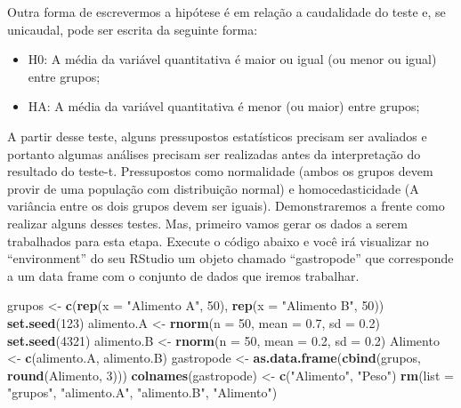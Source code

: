 \documentclass[14pt,titlepage, oneside, openany, a4paper]{book}
\newenvironment{Shaded}{\begin{snugshade}}{\end{snugshade}}
\newcommand{\DataTypeTok}[1]{\textcolor[rgb]{0.13,0.29,0.53}{#1}}
\newcommand{\DecValTok}[1]{\textcolor[rgb]{0.00,0.00,0.81}{#1}}
\newcommand{\FloatTok}[1]{\textcolor[rgb]{0.00,0.00,0.81}{#1}}
\newcommand{\KeywordTok}[1]{\textcolor[rgb]{0.13,0.29,0.53}{\textbf{#1}}}
\newcommand{\NormalTok}[1]{#1}
\newcommand{\StringTok}[1]{\textcolor[rgb]{0.31,0.60,0.02}{#1}}
\begin{document}
Outra forma de escrevermos a hipótese é em relação a caudalidade do teste e, se unicaudal, pode ser escrita da seguinte forma:

\begin{itemize}
\item
  H0: A média da variável quantitativa é maior ou igual (ou menor ou igual) entre grupos;
\item
  HA: A média da variável quantitativa é menor (ou maior) entre grupos;
\end{itemize}

A partir desse teste, alguns pressupostos estatísticos precisam ser avaliados e portanto algumas análises precisam ser realizadas antes da interpretação do resultado do teste-t. Pressupostos como normalidade (ambos os grupos devem provir de uma população com distribuição normal) e homocedasticidade (A variância entre os dois grupos devem ser iguais). Demonstraremos a frente como realizar alguns desses testes. Mas, primeiro vamos gerar os dados a serem trabalhados para esta etapa. Execute o código abaixo e você irá visualizar no ``environment'' do seu RStudio um objeto chamado ``gastropode'' que corresponde a um data frame com o conjunto de dados que iremos trabalhar.

\begin{Shaded}
\begin{Highlighting}[]
\NormalTok{grupos <-}\StringTok{ }\KeywordTok{c}\NormalTok{(}\KeywordTok{rep}\NormalTok{(}\DataTypeTok{x =} \StringTok{"Alimento A"}\NormalTok{, }\DecValTok{50}\NormalTok{), }\KeywordTok{rep}\NormalTok{(}\DataTypeTok{x =} \StringTok{"Alimento B"}\NormalTok{, }\DecValTok{50}\NormalTok{))}
\KeywordTok{set.seed}\NormalTok{(}\DecValTok{123}\NormalTok{)}
\NormalTok{alimento.A <-}\StringTok{ }\KeywordTok{rnorm}\NormalTok{(}\DataTypeTok{n =} \DecValTok{50}\NormalTok{, }\DataTypeTok{mean =} \FloatTok{0.7}\NormalTok{, }\DataTypeTok{sd =} \FloatTok{0.2}\NormalTok{)}
\KeywordTok{set.seed}\NormalTok{(}\DecValTok{4321}\NormalTok{)}
\NormalTok{alimento.B <-}\StringTok{ }\KeywordTok{rnorm}\NormalTok{(}\DataTypeTok{n =} \DecValTok{50}\NormalTok{, }\DataTypeTok{mean =} \FloatTok{0.2}\NormalTok{, }\DataTypeTok{sd =} \FloatTok{0.2}\NormalTok{)}
\NormalTok{Alimento <-}\StringTok{ }\KeywordTok{c}\NormalTok{(alimento.A, alimento.B)}
\NormalTok{gastropode <-}\StringTok{ }\KeywordTok{as.data.frame}\NormalTok{(}\KeywordTok{cbind}\NormalTok{(grupos, }\KeywordTok{round}\NormalTok{(Alimento, }\DecValTok{3}\NormalTok{)))}
\KeywordTok{colnames}\NormalTok{(gastropode) <-}\StringTok{ }\KeywordTok{c}\NormalTok{(}\StringTok{"Alimento"}\NormalTok{, }\StringTok{"Peso"}\NormalTok{)}
\KeywordTok{rm}\NormalTok{(}\DataTypeTok{list =} \StringTok{"grupos"}\NormalTok{, }\StringTok{"alimento.A"}\NormalTok{, }\StringTok{"alimento.B"}\NormalTok{, }\StringTok{"Alimento"}\NormalTok{)}
\end{Highlighting}
\end{Shaded}
\end{document}
